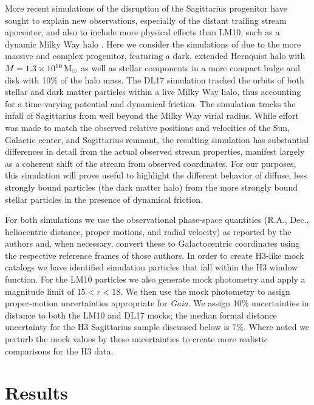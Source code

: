 \documentclass[twocolumn,tighten,twocolappendix]{aastex63}
\newcommand{\sgr}{Sagittarius}
\begin{document}
\begin{CJK*}{UTF8}{gbsn}
More recent simulations of the disruption of the \sgr{} progenitor have sought to explain new observations, especially of the distant trailing stream apocenter, and also to include more physical effects than LM10, such as a dynamic Milky Way halo \citep[e.g.,][]{Gibbons14, DL17, Laporte18, Fardal19}.  Here we consider the simulations of \citet[][DL17 hereafter]{DL17} due to the more massive and complex progenitor, featuring a dark, extended Hernquist halo with $M=1.3\times 10^{10} \,{\rm M}_\odot$ as well as stellar components in a more compact bulge and disk with 10\% of the halo mass.  The DL17 simulation tracked the orbits of both stellar and dark matter particles within a live Milky Way halo, thus accounting for a time-varying potential and dynamical friction. The simulation tracks the infall of \sgr{} from well beyond the Milky Way virial radius.  While effort was made to match the observed relative positions and velocities of the Sun, Galactic center, and \sgr{} remnant, the resulting simulation has substantial differences in detail from the actual observed stream properties, manifest largely as a coherent shift of the stream from observed coordinates.  For our purposes, this simulation will prove useful to highlight the different behavior of diffuse, less strongly bound particles (the dark matter halo) from the more strongly bound stellar particles in the presence of dynamical friction.

For both simulations we use the observational phase-space quantities (R.A., Dec., heliocentric distance, proper motions, and radial velocity) as reported by the authors and, when necessary, convert these to Galactocentric coordinates using the respective reference frames of those authors.  In order to create H3-like mock catalogs we have identified simulation particles that fall within the H3 window function.  For the LM10 particles we also generate mock photometry and apply a magnitude limit of $15<r<18$.  We then use the mock photometry to assign proper-motion uncertainties appropriate for \emph{Gaia}. We assign 10\% uncertainties in distance to both the LM10 and DL17 mocks; the median formal distance uncertainty for the H3 \sgr{} sample discussed below is 7\%.  Where noted we perturb the mock values by these uncertainties to create more realistic comparisons for the H3 data.


\section{Results}
\label{sec:results}



\end{CJK*}
\end{document}
